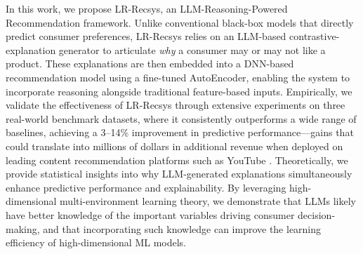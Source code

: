 In this work, we propose LR-Recsys, an LLM-Reasoning-Powered Recommendation framework. Unlike conventional black-box models that directly predict consumer preferences, LR-Recsys relies on an LLM-based contrastive-explanation generator to articulate \emph{why} a consumer may or may not like a product. These explanations are then embedded into a DNN-based recommendation model using a fine-tuned AutoEncoder, enabling the system to incorporate reasoning alongside traditional feature-based inputs. Empirically, we validate the effectiveness of LR-Recsys through extensive experiments on three real-world benchmark datasets, where it consistently outperforms a wide range of baselines, achieving a 3–14\% improvement in predictive performance—gains that could translate into millions of dollars in additional revenue when deployed on leading content recommendation platforms such as YouTube \citep{li2024variety, wang2024going}. Theoretically, we provide statistical insights into why LLM-generated explanations simultaneously enhance predictive performance and explainability. By leveraging high-dimensional multi-environment learning theory, we demonstrate that LLMs likely have better knowledge of the important variables driving consumer decision-making, and that incorporating such knowledge can improve the learning efficiency of high-dimensional ML models.



